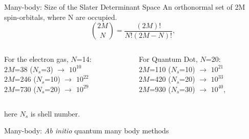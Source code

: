 \documentclass{beamer}
\begin{document}
 \begin{frame}{Many-body: Size of the Slater Determinant Space}
An orthonormal set of 2M spin-orbitals, where N are occupied.
\begin{equation*}
\binom {2M}{N} = \frac{(2M)!}{N!(2M-N)!}, 
\end{equation*}
\begin{center}
	\begin{columns}
		\begin{column}{0.5\textwidth}
For the electron gas, $N$=14:   \\
$2M$=38 ($N_s$=3)  	$\rightarrow$ $10^{10}$ \\
$2M$=246 ($N_s$=10)	$\rightarrow$ $10^{22}$\\
$2M$=730 ($N_s$=20)	$\rightarrow$ $10^{29}$
		\end{column}
		\begin{column}{0.5\textwidth}  %
			For Quantum Dot, $N$=20:   \\
			$2M$=110 ($N_s$=10)  	$\rightarrow$ $10^{21}$ \\
			$2M$=420 ($N_s$=20)	$\rightarrow$ $10^{33}$\\
			$2M$=930 ($N_s$=30)	$\rightarrow$ $10^{40}$,
		\end{column}
	\end{columns}
\end{center}
here $N_s$ is shell number.
\end{frame}

  \begin{frame}{Many-body: \textit{Ab initio} quantum many body methods}
\end{frame}
\end{document}

